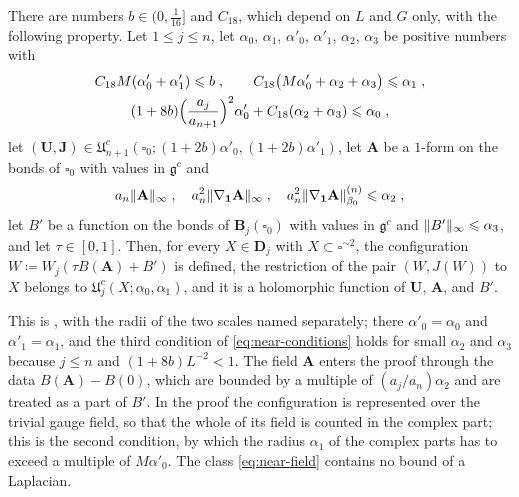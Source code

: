 \documentclass[11pt]{preprint}
\newcommand{\id}{\mathbf 1}
\DeclarePairedDelimiter{\norm}{\lVert}{\rVert}
\numberwithin{equation}{section}
\begin{document}
\begin{proposition}\label{prop:near-pairs}
There are numbers $b \in (0, \frac{1}{16}]$ and $C_{18}$, which depend on $L$ and $G$ only, with the following property. Let $1 \leqslant j \leqslant n$, let $\alpha_0$, $\alpha_1$, $\alpha'_0$, $\alpha'_1$, $\alpha_2$, $\alpha_3$ be positive numbers with
\begin{equation}\label{eq:near-conditions}
\begin{gathered}
    C_{18}M(\alpha'_0 + \alpha'_1) \leqslant b\;,
    \qquad
    C_{18}\bigl(M\alpha'_0 + \alpha_2 + \alpha_3\bigr) \leqslant \alpha_1\;,\\
    (1 + 8b)\Bigl(\frac{a_j}{a_{n+1}}\Bigr)^2\alpha'_0 + C_{18}(\alpha_2 + \alpha_3) \leqslant \alpha_0\;,
\end{gathered}
\end{equation}
let $(\mathbf U, \mathbf J) \in \mathfrak U^c_{n+1}(\square_0; (1 + 2b)\alpha'_0, (1 + 2b)\alpha'_1)$, let $\mathbf A$ be a $1$-form on the bonds of $\square_0$ with values in $\mathfrak g^c$ and
\begin{equation}\label{eq:near-field}
    a_n\norm{\mathbf A}_\infty\;,\quad
    a_n^2\norm{\nabla_{\id}\mathbf A}_\infty\;,\quad
    a_n^2\norm{\nabla_{\id}\mathbf A}^{(n)}_{\beta_0} \leqslant \alpha_2\;,
\end{equation}
let $B'$ be a function on the bonds of $\mathbf B_j(\square_0)$ with values in $\mathfrak g^c$ and $\norm{B'}_\infty \leqslant \alpha_3$, and let $\tau \in [0, 1]$. Then, for every $X \in \mathbf D_j$ with $X \subset \square^{\sim2}$, the configuration $W \coloneqq W_j(\tau B(\mathbf A) + B')$ is defined, the restriction of the pair $(W, J(W))$ to $X$ belongs to $\mathfrak U^c_j(X; \alpha_0, \alpha_1)$, and it is a holomorphic function of $\mathbf U$, $\mathbf A$, and $B'$.
\end{proposition}

This is \cite[Lemma~4, p.~280]{BalabanRG1}, with the radii of the two scales named separately; there $\alpha'_0 = \alpha_0$ and $\alpha'_1 = \alpha_1$, and the third condition of \eqref{eq:near-conditions} holds for small $\alpha_2$ and $\alpha_3$ because $j \leqslant n$ and $(1 + 8b)L^{-2} < 1$. The field $\mathbf A$ enters the proof through the data $B(\mathbf A) - B(0)$, which are bounded by a multiple of $(a_j/a_n)\alpha_2$ and are treated as a part of $B'$. In the proof the configuration is represented over the trivial gauge field, so that the whole of its field is counted in the complex part; this is the second condition, by which the radius $\alpha_1$ of the complex parts has to exceed a multiple of $M\alpha'_0$. The class \eqref{eq:near-field} contains no bound of a Laplacian.
\end{document}
